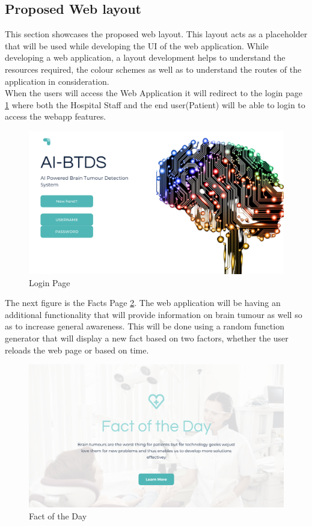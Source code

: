 \subsection{Proposed Web layout}
This section showcases the proposed web layout. This layout acts as a placeholder that will be used while developing the UI of the web application. While developing a web application, a layout development helps to understand the resources required, the colour schemes as well as to understand the routes of the application in consideration. \\ 
When the users will access the Web Application it will redirect to the login page \ref{fig:webapp_1} where both the Hospital Staff and the end user(Patient) will be able to login to access the webapp features.
\begin{figure}[H]
\includegraphics[scale=0.45]{Photos/webapp_1.png}
\caption{Login Page} \label{fig:webapp_1}
\end{figure}
The next figure is the Facts Page \ref{fig:webapp_2}. The web application will be having an additional functionality that will provide information on brain tumour as well so as to increase general awareness. This will be done using a random function generator that will display a new fact based on two factors, whether the user reloads the web page or based on time.
\begin{figure}[H]
\includegraphics[scale=0.45]{Photos/webapp_2.png}
\caption{Fact of the Day} \label{fig:webapp_2}
\end{figure}
